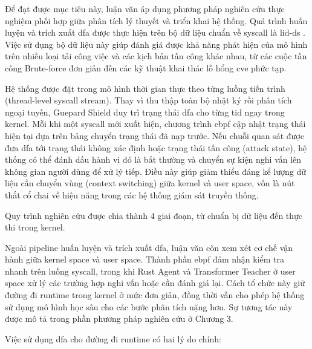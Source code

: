\documentclass[../main.tex]{subfiles}
\begin{document}
Để đạt được mục tiêu này, luận văn áp dụng phương pháp nghiên cứu thực
nghiệm phối hợp giữa phân tích lý thuyết và triển khai hệ thống. Quá
trình huấn luyện và trích xuất \gls{dfa} được thực hiện trên bộ dữ liệu
chuẩn về \gls{syscall} là \gls{lid-ds} \cite{grimmer2022dataset}. Việc sử
dụng bộ dữ liệu này giúp đánh giá được khả năng phát hiện
của mô hình trên nhiều loại tải công việc và các kịch bản tấn công
khác nhau, từ các cuộc tấn công Brute-force đơn giản đến các kỹ thuật
khai thác lỗ hổng \gls{cve} phức tạp.

Hệ thống được đặt trong mô hình thời gian thực theo từng luồng tiến
trình (thread-level \gls{syscall} stream). Thay vì thu thập toàn bộ nhật ký
rồi phân tích ngoại tuyến, Guepard Shield duy trì trạng thái \gls{dfa} cho
từng \gls{tid} ngay trong kernel. Mỗi khi một
\gls{syscall} mới xuất hiện, chương trình \gls{ebpf} cập nhật trạng thái hiện tại
dựa trên bảng chuyển trạng thái đã nạp trước. Nếu chuỗi quan sát được
đưa \gls{dfa} tới trạng thái không xác định hoặc trạng thái tấn công
(attack state), hệ thống có thể đánh dấu hành vi đó là bất thường
và chuyển sự kiện nghi vấn lên không gian người dùng để xử lý tiếp.
Điều này giúp giảm thiểu đáng kể lượng dữ liệu cần chuyển vùng (context
switching) giữa kernel và user space, vốn là nút thắt cổ chai về hiệu
năng trong các hệ thống giám sát truyền thống.

Quy trình nghiên cứu được chia thành 4 giai đoạn, từ chuẩn bị dữ
liệu đến thực thi trong kernel.

Ngoài pipeline huấn luyện và trích xuất \gls{dfa}, luận văn còn xem xét cơ
chế vận hành giữa kernel space và user space. Thành phần \gls{ebpf} đảm
nhận kiểm tra nhanh trên luồng \gls{syscall}, trong khi Rust Agent và
Transformer Teacher ở user space xử lý các trường hợp nghi vấn hoặc
cần đánh giá lại. Cách tổ chức này giữ đường đi runtime trong kernel
ở mức đơn giản, đồng thời vẫn cho phép hệ thống sử dụng mô hình học
sâu cho các bước phân tích nặng hơn. Sự tương tác này được mô tả
trong phần phương pháp nghiên cứu ở Chương 3.

Việc sử dụng \gls{dfa} cho đường đi runtime có hai lý do chính:
\end{document}
